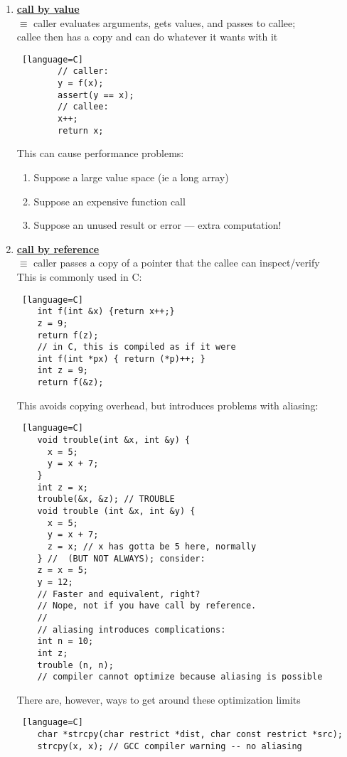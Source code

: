 \documentclass[../../lecture_notes.tex]{subfiles}
\begin{document}
\begin{enumerate} [itemsep=0mm]
	\item \textbf{\underline{call by value}}\\
		$\equiv$ caller evaluates arguments, gets values, and passes to callee;\\
				callee then has a copy and can do whatever it wants with it
		\begin{lstlisting} [language=C]
		// caller:
		y = f(x);
		assert(y == x);
		// callee:
		x++;
 		return x;
		\end{lstlisting}
 		This can cause performance problems:
		\begin{enumerate} [itemsep=0mm]
			\item Suppose a large value space (ie a long array)
			\item Suppose an expensive function call
			\item Suppose an unused result or error — extra computation!
		\end{enumerate}
	\item \textbf{\underline{call by reference}}\\
		$\equiv$ caller passes a copy of a pointer that the callee can inspect/verify\\
		This is commonly used in C:
		\begin{lstlisting} [language=C]
	int f(int &x) {return x++;}
	z = 9;
	return f(z);
	// in C, this is compiled as if it were
	int f(int *px) { return (*p)++; }
	int z = 9;
	return f(&z);
		\end{lstlisting}
		This avoids copying overhead, but introduces problems with aliasing:
		\begin{lstlisting} [language=C]
	void trouble(int &x, int &y) {
	  x = 5;
	  y = x + 7;
	}
	int z = x;
	trouble(&x, &z); // TROUBLE
	void trouble (int &x, int &y) {
	  x = 5;
	  y = x + 7;
	  z = x; // x has gotta be 5 here, normally
 	} //  (BUT NOT ALWAYS); consider:
	z = x = 5; 
	y = 12; 
	// Faster and equivalent, right?
	// Nope, not if you have call by reference.
	//
	// aliasing introduces complications:
	int n = 10;
	int z;
	trouble (n, n); 
	// compiler cannot optimize because aliasing is possible
	\end{lstlisting}
	There are, however, ways to get around these optimization limits
	\begin{lstlisting} [language=C]
	char *strcpy(char restrict *dist, char const restrict *src);
	strcpy(x, x); // GCC compiler warning -- no aliasing
		\end{lstlisting}

\end{enumerate}
\end{document}
